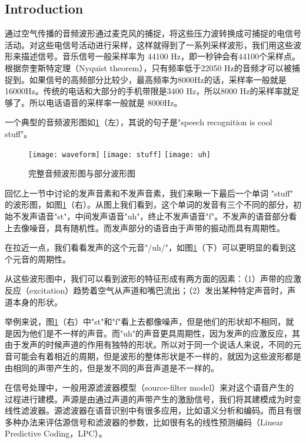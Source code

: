 \subsection{Introduction} %
\label{sub:introduction}
通过空气传播的音频波形通过麦克风的捕捉，将这些压力波转换成可捕捉的电信号活动。对这些电信号活动进行采样，这样就得到了一系列采样波形，我们用这些波形来描述信号。音乐信号一般采样率为 44100 Hz，即一秒钟会有44100个采样点。根据奈奎斯特定理（Nyquist theorem），只有频率低于22050 Hz的音频才可以被捕捉到。如果信号的高频部分比较少，最高频率为8000Hz的话，采样率一般就是16000Hz。传统的电话和大部分的手机带限是3400 Hz，所以8000 Hz的采样率就足够了。所以电话语音的采样率一般就是 8000Hz。

一个典型的音频波形图如\ref{fig:wavform}（左），其说的句子是"speech recognition is cool stuff"。
\begin{figure}[!ht]
	\centering
	\texttt{[image: waveform]}
	\hspace{1cm}
	\texttt{[image: stuff]}
	\hspace{1cm}
	\texttt{[image: uh]}
	\caption{完整音频波形图与部分波形图}
\label{fig:wavform}
\end{figure}

回忆上一节中讨论的发声音素和不发声音素，我们来瞅一下最后一个单词 "stuff" 的波形图，如图\ref{fig:wavform}（右）。从图上我们看到，这个单词的发音有三个不同的部分，初始不发声语音"st"，中间发声语音"uh"，终止不发声语音"f"。不发声的语音部分看上去像噪音，具有随机性。而发声部分的语音由于声带的振动而具有周期性。

在拉近一点，我们看看发声的这个元音"/uh/"，如图\ref{fig:wavform}（下）可以更明显的看到这个元音的周期性。

从这些波形图中，我们可以看到波形的特征形成有两方面的因素：（1）声带的应激反应（excitation）趋势着空气从声道和嘴巴流出；（2）发出某种特定声音时，声道本身的形状。

举例来说，图\ref{fig:wavform}（右）中"st"和"f"看上去都像噪声，但是他们的形状却不相同，就是因为他们是不一样的声音。而"uh"的声音更具周期性，因为发声的应激反应，其由于发声的时候声道的作用有独特的形状。所以对于同一个说话人来说，不同的元音可能会有着相近的周期，但是波形的整体形状是不一样的，就因为这些波形都是由相同的声带产生的，但是发不同的声音声道是不一样的。

在信号处理中，一般用源滤波器模型（source-filter model）来对这个语音产生的过程进行建模。声源是由通过声道的声带产生的激励信号，我们将其建模成为时变线性滤波器。源滤波器在语音识别中有很多应用，比如语义分析和编码。而且有很多种办法来评估源信号和滤波器的参数，比如很有名的线性预测编码（Linear Predictive Coding，LPC）。

